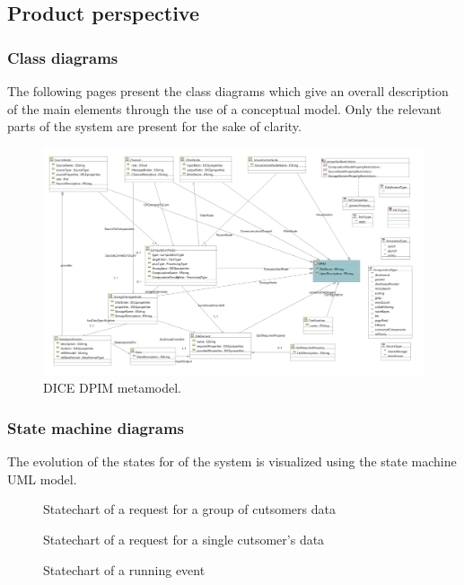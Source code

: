 \subsection{Product perspective}
\subsubsection{Class diagrams}
The following pages present the class diagrams which give an overall description of the main elements through the use of a conceptual model. Only the relevant parts of the system are present for the sake of clarity.
\begin{figure}
\centering
\includegraphics[width=\textwidth]{Images/11.png}
\caption{\label{fig:metamodel}DICE DPIM metamodel.}
\end{figure}

\newpage
\subsubsection{State machine diagrams}
{\todo
The evolution of the states for of the system is visualized using the state machine UML model.

    \begin{figure}[H]
        \caption{Statechart of a request for a group of cutsomers data}
        \label{fig:statemachine_grpreq}
    \end{figure}

    \begin{figure}[H]
        \caption{Statechart of a request for a single cutsomer's data}
        \label{fig:statemachine_specreq}
    \end{figure}

    \begin{figure}[H]
        \caption{Statechart of a running event}
        \label{fig:statemachine_runevent}
    \end{figure}
}


